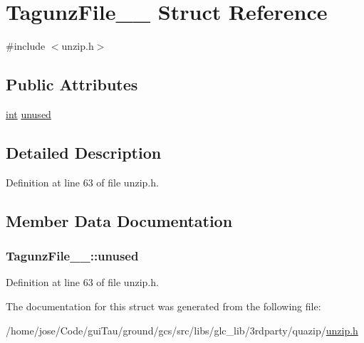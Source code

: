 \hypertarget{struct_tagunz_file____}{\section{Tagunz\-File\-\_\-\-\_\- Struct Reference}
\label{struct_tagunz_file____}
}


{\ttfamily \#include $<$unzip.\-h$>$}

\subsection*{Public Attributes}
\begin{DoxyCompactItemize}
\item 
\hyperlink{ioapi_8h_a787fa3cf048117ba7123753c1e74fcd6}{int} \hyperlink{struct_tagunz_file_____af71ed0d7a0d2b19dac7f72aaa1904adb}{unused}
\end{DoxyCompactItemize}


\subsection{Detailed Description}


Definition at line 63 of file unzip.\-h.



\subsection{Member Data Documentation}
\hypertarget{struct_tagunz_file_____af71ed0d7a0d2b19dac7f72aaa1904adb}{
\subsubsection[{unused}]{ Tagunz\-File\-\_\-\-\_\-\-::unused}}\label{struct_tagunz_file_____af71ed0d7a0d2b19dac7f72aaa1904adb}


Definition at line 63 of file unzip.\-h.



The documentation for this struct was generated from the following file\-:\begin{DoxyCompactItemize}
\item 
/home/jose/\-Code/gui\-Tau/ground/gcs/src/libs/glc\-\_\-lib/3rdparty/quazip/\hyperlink{unzip_8h}{unzip.\-h}\end{DoxyCompactItemize}
